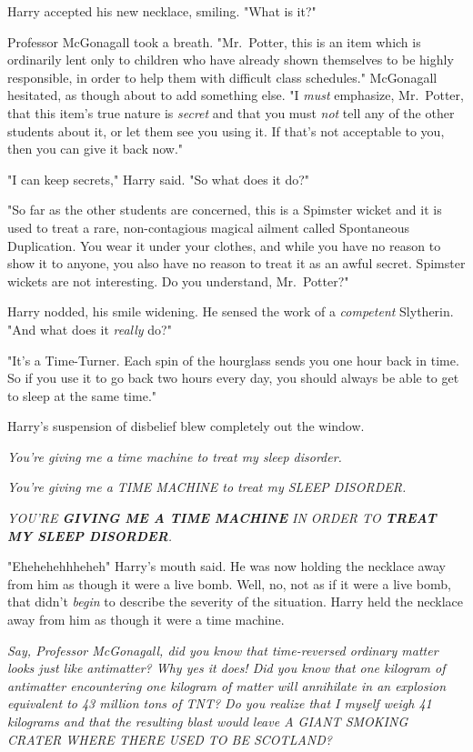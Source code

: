 Harry accepted his new necklace, smiling. "What is it?"

Professor McGonagall took a breath. "Mr.~Potter, this is an item which is
ordinarily lent only to children who have already shown themselves to be highly
responsible, in order to help them with difficult class schedules." McGonagall
hesitated, as though about to add something else. "I \emph{must} emphasize,
Mr.~Potter, that this item's true nature is \emph{secret} and that you
must \emph{not} tell any of the other students about it, or let them see you
using it. If that's not acceptable to you, then you can give it back now."

"I can keep secrets," Harry said. "So what does it do?"

"So far as the other students are concerned, this is a Spimster wicket and it
is used to treat a rare, non-contagious magical ailment called Spontaneous
Duplication. You wear it under your clothes, and while you have no reason to
show it to anyone, you also have no reason to treat it as an awful secret.
Spimster wickets are not interesting. Do you understand, Mr.~Potter?"

Harry nodded, his smile widening. He sensed the work of a \emph{competent}
Slytherin. "And what does it \emph{really} do?"

"It's a Time-Turner. Each spin of the hourglass sends you one hour back in
time. So if you use it to go back two hours every day, you should always be
able to get to sleep at the same time."

Harry's suspension of disbelief blew completely out the window.

\emph{You're giving me a time machine to treat my sleep disorder.}

\emph{You're giving me a TIME MACHINE to treat my SLEEP DISORDER.}

\emph{YOU'RE \textbf{GIVING ME A TIME MACHINE} IN ORDER TO
\textbf{TREAT MY SLEEP DISORDER}.}

"Ehehehehhheheh{\el}" Harry's mouth said. He was now holding the necklace
away from him as though it were a live bomb. Well, no, not as if it were a live
bomb, that didn't \emph{begin} to describe the severity of the situation. Harry
held the necklace away from him as though it were a time machine.

\emph{Say, Professor McGonagall, did you know that time-reversed ordinary
matter looks just like antimatter? Why yes it does! Did you know that one
kilogram of antimatter encountering one kilogram of matter will annihilate in
an explosion equivalent to 43 million tons of TNT? Do you realize that I myself
weigh 41 kilograms and that the resulting blast would leave A GIANT SMOKING
CRATER WHERE THERE USED TO BE SCOTLAND?}

